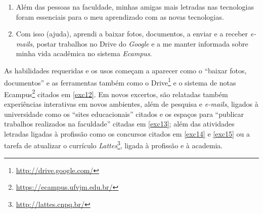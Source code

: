 \documentclass{textolivre}
\begin{document}

\begin{enumerate}[resume,label={(\arabic*)},ref={\arabic*},topsep=1ex,partopsep=1ex]
\item\label{exc11} Além das pessoas na faculdade, minhas amigas mais letradas nas tecnologias foram essenciais para o meu aprendizado com as novas tecnologias.
\item\label{exc12} Com isso (ajuda), aprendi a baixar fotos, documentos, a enviar e a receber \textit{e-mails},  postar trabalhos no Drive do \textit{Google} e a me manter informada sobre minha vida acadêmica no sistema \textit{Ecampus}.
\end{enumerate}

As habilidades requeridas e os usos começam a aparecer como o “baixar fotos, documentos” e as ferramentas também como o Drive\footnote{\url{http://drive.google.com/}} e o sistema de notas Ecampus\footnote{\url{https://ecampus.ufvjm.edu.br/}} citados em \ref{exc12}. Em novos excertos, são relatadas também experiências interativas em novos ambientes, além de pesquisa e \textit{e-mails}, ligados à universidade como os “sites educacionais” citados e os espaços para “publicar trabalhos realizados na faculdade” citadas em \ref{exc13}; além das atividades letradas ligadas à profissão como os concursos citados em \ref{exc14} e \ref{exc15} ou a tarefa de atualizar o currículo \textit{Lattes}\footnote{\url{http://lattes.cnpq.br/}}, ligada à profissão e à academia.
\end{document}
